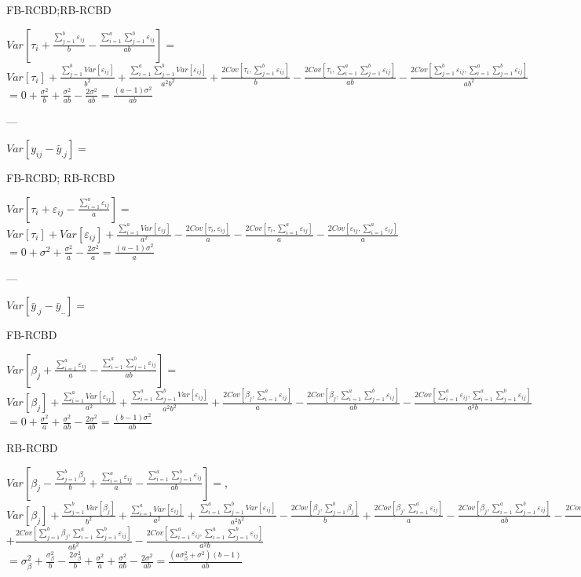 \documentclass[10pt,portrait]{article}
\begin{document}
FB-RCBD;RB-RCBD

$Var[\tau_{i}+\frac{\sum_{j=1}^b\varepsilon_{ij}}b-\frac{\sum_{i=1}^a\sum_{j=1}^b\varepsilon_{ij}}{ab}]=$
$Var[\tau_{i}]+\frac{\sum_{j=1}^bVar[\varepsilon_{ij}]}{b^2}+\frac{\sum_{i=1}^a\sum_{j=1}^bVar[\varepsilon_{ij}]}{a^2b^2}+\frac{2Cov[\tau_{i},\sum_{j=1}^b\varepsilon_{ij}]}{b}-\frac{2Cov[\tau_{i},\sum_{i=1}^a\sum_{j=1}^b\varepsilon_{ij}]}{ab}-\frac{2Cov[\sum_{j=1}^b\varepsilon_{ij},\sum_{i=1}^a\sum_{j=1}^b\varepsilon_{ij}]}{ab^2}$
$=0+\frac{\sigma^2}{b}+\frac{\sigma^2}{ab}-\frac{2\sigma^2}{ab}=\frac{(a-1)\sigma^2}{ab}$

 ---

$Var[y_{ij}-\bar y_{.j}]=$

FB-RCBD; RB-RCBD

$Var[\tau_{i}+\varepsilon_{ij}-\frac{\sum_{i=1}^a\varepsilon_{ij}}a]=$
$Var[\tau_{i}]+Var[\varepsilon_{ij}]+\frac{\sum_{i=1}^aVar[\varepsilon_{ij}]}{a^2}-\frac{2Cov[\tau_{i},\varepsilon_{ij}]}a-\frac{2Cov[\tau_{i},\sum_{i=1}^a\varepsilon_{ij}]}a-\frac{2Cov[\varepsilon_{ij},\sum_{i=1}^a\varepsilon_{ij}]}a$
$=0+\sigma^2+\frac{\sigma^2}a-\frac{2\sigma^2}a=\frac{(a-1)\sigma^2}a$

 ---

$Var[\bar y_{.j}-\bar y_{..}]=$

FB-RCBD

$Var[\beta_{j}+\frac{\sum_{i=1}^a\varepsilon_{ij}}a-\frac{\sum_{i=1}^a\sum_{j=1}^b\varepsilon_{ij}}{ab}]=$
$Var[\beta_{j}]+\frac{\sum_{i=1}^aVar[\varepsilon_{ij}]}{a^2}+\frac{\sum_{i=1}^a\sum_{j=1}^bVar[\varepsilon_{ij}]}{a^2b^2}+\frac{2Cov[\beta_{j},\sum_{i=1}^a\varepsilon_{ij}]}{a}-\frac{2Cov[\beta_{j},\sum_{i=1}^a\sum_{j=1}^b\varepsilon_{ij}]}{ab}-\frac{2Cov[\sum_{i=1}^a\varepsilon_{ij},\sum_{i=1}^a\sum_{j=1}^b\varepsilon_{ij}]}{a^2b}$
$=0+\frac{\sigma^2}{a}+\frac{\sigma^2}{ab}-\frac{2\sigma^2}{ab}=\frac{(b-1)\sigma^2}{ab}$

RB-RCBD

$Var[\beta_{j}-\frac{\sum_{j=1}^b\beta_{j}}{b}+\frac{\sum_{i=1}^a\varepsilon_{ij}}a-\frac{\sum_{i=1}^a\sum_{j=1}^b\varepsilon_{ij}}{ab}]=$,
$Var[\beta_{j}]+\frac{\sum_{j=1}^bVar[\beta_{j}]}{b^2}+\frac{\sum_{i=1}^aVar[\varepsilon_{ij}]}{a^2}+\frac{\sum_{i=1}^a\sum_{j=1}^bVar[\varepsilon_{ij}]}{a^2b^2}-\frac{2Cov[\beta_{j},\sum_{j=1}^b\beta_{j}]}b+\frac{2Cov[\beta_{j},\sum_{i=1}^a\varepsilon_{ij}]}a-\frac{2Cov[\beta_{j},\sum_{i=1}^a\sum_{j=1}^b\varepsilon_{ij}]}{ab}-\frac{2Cov[\sum_{j=1}^b\beta_{j},\sum_{i=1}^a\varepsilon_{ij}]}{ab}$
$+\frac{2Cov[\sum_{j=1}^b\beta_{j},\sum_{i=1}^a\sum_{j=1}^b\varepsilon_{ij}]}{ab^2}-\frac{2Cov[\sum_{i=1}^a\varepsilon_{ij},\sum_{i=1}^a\sum_{j=1}^b\varepsilon_{ij}]}{a^2b}$
$=\sigma_{\beta}^2+\frac{\sigma_{\beta}^2}{b}-\frac{2\sigma_{\beta}^2}{b}+\frac{\sigma^2}{a}+\frac{\sigma^2}{ab}-\frac{2\sigma^2}{ab}=\frac{(a\sigma_{\beta}^2+\sigma^2)(b-1)}{ab}$
\end{document}
